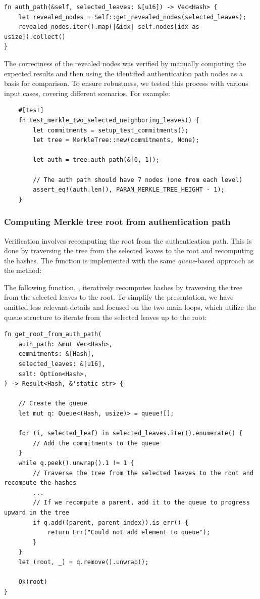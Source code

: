 \documentclass[11pt]{report}
\theoremstyle{definition}
\theoremstyle{plain}
\begin{document}
\begin{verbatim}
fn auth_path(&self, selected_leaves: &[u16]) -> Vec<Hash> {
    let revealed_nodes = Self::get_revealed_nodes(selected_leaves);
    revealed_nodes.iter().map(|&idx| self.nodes[idx as usize]).collect()
}
\end{verbatim}

The correctness of the revealed nodes was verified by manually computing the expected results and then using the identified authentication path nodes as a basis for comparison. To ensure robustness, we tested this process with various input cases, covering different scenarios. For example:

\begin{verbatim}
    #[test]
    fn test_merkle_two_selected_neighboring_leaves() {
        let commitments = setup_test_commitments();
        let tree = MerkleTree::new(commitments, None);

        let auth = tree.auth_path(&[0, 1]);

        // The auth path should have 7 nodes (one from each level)
        assert_eq!(auth.len(), PARAM_MERKLE_TREE_HEIGHT - 1);
    }
\end{verbatim}

\subsubsection{Computing Merkle tree root from authentication path}\label{sub:get_root_from_auth_path}
Verification involves recomputing the root from the authentication path. This is done by traversing the tree from the selected leaves to the root and recomputing the hashes. The function is implemented with the same \textit{queue}-based approach as the  method:

The following function, , iteratively recomputes hashes by traversing the tree from the selected leaves to the root. To simplify the presentation, we have omitted less relevant details and focused on the two main loops, which utilize the queue structure to iterate from the selected leaves up to the root:

\begin{verbatim}
fn get_root_from_auth_path(
    auth_path: &mut Vec<Hash>,
    commitments: &[Hash],
    selected_leaves: &[u16],
    salt: Option<Hash>,
) -> Result<Hash, &'static str> {

    // Create the queue
    let mut q: Queue<(Hash, usize)> = queue![];

    for (i, selected_leaf) in selected_leaves.iter().enumerate() {
        // Add the commitments to the queue
    }
    while q.peek().unwrap().1 != 1 {
        // Traverse the tree from the selected leaves to the root and recompute the hashes
        ...
        // If we recompute a parent, add it to the queue to progress upward in the tree
        if q.add((parent, parent_index)).is_err() {
            return Err("Could not add element to queue");
        }
    }
    let (root, _) = q.remove().unwrap();

    Ok(root)
}
\end{verbatim}
\end{document}
